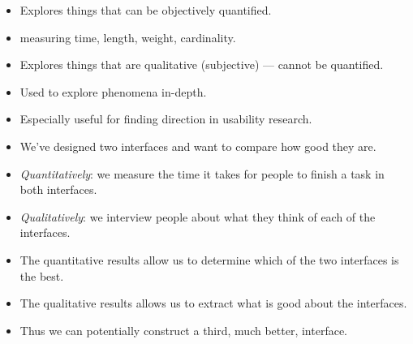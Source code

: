 \begin{frame}
  \begin{definition}
    \begin{itemize}
      \item Explores things that can be objectively quantified.
      \item \Eg measuring time, length, weight, cardinality.
    \end{itemize}
  \end{definition}

  \begin{definition}
    \begin{itemize}
      \item Explores things that are qualitative (subjective) --- cannot be 
        quantified.
      \item Used to explore phenomena in-depth.
      \item Especially useful for finding direction in usability research.
    \end{itemize}
  \end{definition}
\end{frame}

\begin{frame}
  \begin{example}
    \begin{itemize}
      \item We've designed two interfaces and want to compare how good they 
        are.

      \item \emph{Quantitatively}: we measure the time it takes for people to 
        finish a task in both interfaces.

      \item \emph{Qualitatively}: we interview people about what they think of 
        each of the interfaces.
    \end{itemize}
  \end{example}
\end{frame}

\begin{frame}
  \begin{remark}
    \begin{itemize}
      \item The quantitative results allow us to determine which of the two 
        interfaces is the best.

      \item The qualitative results allows us to extract what is good about the 
        interfaces.

      \item Thus we can potentially construct a third, much better, interface.
    \end{itemize}
  \end{remark}
\end{frame}


